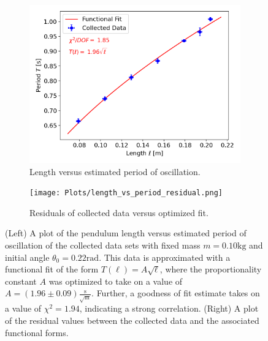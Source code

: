 \begin{figure}[H]
\centering
\begin{subfigure}[t]{0.5\textwidth}
  \centering
  \includegraphics[width=1\linewidth]{Plots/length_vs_period.png}
  \caption{\small{Length versus estimated period of oscillation.}}
  \label{length_period}
\end{subfigure}%
\begin{subfigure}[t]{0.5\textwidth}
  \centering
  \texttt{[image: Plots/length\_vs\_period\_residual.png]}
  \caption{\small{Residuals of collected data versus optimized fit.}}
  \label{length_period_residual}
\end{subfigure}
\caption{\small{(Left) A plot of the pendulum length versus estimated period of oscillation of the collected data sets with fixed mass $m = 0.10\text{kg}$ and initial angle $\theta_0 = 0.22\text{rad}$. This data is approximated with a functional fit of the form $T(\ell) = A\sqrt{\ell}$, where the proportionality constant $A$ was optimized to take on a value of $A = (1.96\pm 0.09)\frac{\text{s}}{\sqrt{\text{m}}}$. Further, a goodness of fit estimate takes on a value of $\chi^2 = 1.94$, indicating a strong correlation. (Right) A plot of the residual values between the collected data and the associated functional forms.}}
\end{figure}


